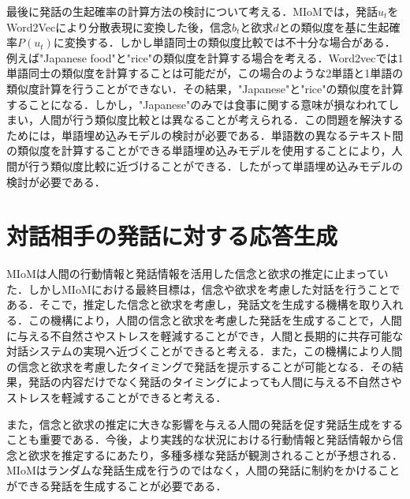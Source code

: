 \par
最後に発話の生起確率の計算方法の検討について考える．MIoMでは，発話$u_t$をWord2Vecにより分散表現に変換した後，信念$b_t$と欲求$d$との類似度を基に生起確率$P(u_t)$に変換する．しかし単語同士の類似度比較では不十分な場合がある．例えば"Japanese food"と"rice"の類似度を計算する場合を考える．Word2vecでは1単語同士の類似度を計算することは可能だが，この場合のような2単語と1単語の類似度計算を行うことができない．その結果，"Japanese"と"rice"の類似度を計算することになる．しかし，"Japanese"のみでは食事に関する意味が損なわれてしまい，人間が行う類似度比較とは異なることが考えられる．この問題を解決するためには，単語埋め込みモデルの検討が必要である．単語数の異なるテキスト間の類似度を計算することができる単語埋め込みモデルを使用することにより，人間が行う類似度比較に近づけることができる．したがって単語埋め込みモデルの検討が必要である．


\section{対話相手の発話に対する応答生成}

\par
MIoMは人間の行動情報と発話情報を活用した信念と欲求の推定に止まっていた．しかしMIoMにおける最終目標は，信念や欲求を考慮した対話を行うことである．そこで，推定した信念と欲求を考慮し，発話文を生成する機構を取り入れる．この機構により，人間の信念と欲求を考慮した発話を生成することで，人間に与える不自然さやストレスを軽減することができ，人間と長期的に共存可能な対話システムの実現へ近づくことができると考える．また，この機構により人間の信念と欲求を考慮したタイミングで発話を提示することが可能となる．その結果，発話の内容だけでなく発話のタイミングによっても人間に与える不自然さやストレスを軽減することができると考える．

\par
また，信念と欲求の推定に大きな影響を与える人間の発話を促す発話生成をすることも重要である．今後，より実践的な状況における行動情報と発話情報から信念と欲求を推定するにあたり，多種多様な発話が観測されることが予想される．MIoMはランダムな発話生成を行うのではなく，人間の発話に制約をかけることができる発話を生成することが必要である．
